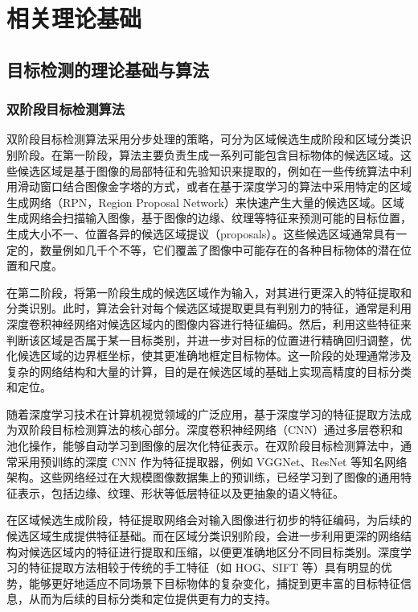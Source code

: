 \section{相关理论基础\label{相关工作}}

\subsection{目标检测的理论基础与算法}

\subsubsection{双阶段目标检测算法}

双阶段目标检测算法采用分步处理的策略，可分为区域候选生成阶段和区域分类识别阶段。在第一阶段，算法主要负责生成一系列可能包含目标物体的候选区域。这些候选区域是基于图像的局部特征和先验知识来提取的，例如在一些传统算法中利用滑动窗口结合图像金字塔的方式，或者在基于深度学习的算法中采用特定的区域生成网络（RPN，Region Proposal Network）来快速产生大量的候选区域。区域生成网络会扫描输入图像，基于图像的边缘、纹理等特征来预测可能的目标位置，生成大小不一、位置各异的候选区域提议（proposals）。这些候选区域通常具有一定的，数量例如几千个不等，它们覆盖了图像中可能存在的各种目标物体的潜在位置和尺度。

在第二阶段，将第一阶段生成的候选区域作为输入，对其进行更深入的特征提取和分类识别。此时，算法会针对每个候选区域提取更具有判别力的特征，通常是利用深度卷积神经网络对候选区域内的图像内容进行特征编码。然后，利用这些特征来判断该区域是否属于某一目标类别，并进一步对目标的位置进行精确回归调整，优化候选区域的边界框坐标，使其更准确地框定目标物体。这一阶段的处理通常涉及复杂的网络结构和大量的计算，目的是在候选区域的基础上实现高精度的目标分类和定位。

随着深度学习技术在计算机视觉领域的广泛应用，基于深度学习的特征提取方法成为双阶段目标检测算法的核心部分。深度卷积神经网络（CNN）通过多层卷积和池化操作，能够自动学习到图像的层次化特征表示。在双阶段目标检测算法中，通常采用预训练的深度 CNN 作为特征提取器，例如 VGGNet、ResNet 等知名网络架构。这些网络经过在大规模图像数据集上的预训练，已经学习到了图像的通用特征表示，包括边缘、纹理、形状等低层特征以及更抽象的语义特征。

在区域候选生成阶段，特征提取网络会对输入图像进行初步的特征编码，为后续的候选区域生成提供特征基础。而在区域分类识别阶段，会进一步利用更深的网络结构对候选区域内的特征进行提取和压缩，以便更准确地区分不同目标类别。深度学习的特征提取方法相较于传统的手工特征（如 HOG、SIFT 等）具有明显的优势，能够更好地适应不同场景下目标物体的复杂变化，捕捉到更丰富的目标特征信息，从而为后续的目标分类和定位提供更有力的支持。

